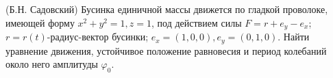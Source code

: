 (Б.Н. Садовский)
Бусинка единичной массы движется по гладкой проволоке, имеющей
форму $x^2+y^2=1,z=1$, под действием силы $F=r+e_y-e_x$;
$r=r(t)$-радиус-вектор бусинки; $e_x=(1,0,0),e_y=(0,1,0)$. Найти уравнение
движения, устойчивое положение равновесия и период колебаний около
него амплитуды $\varphi_0$.

